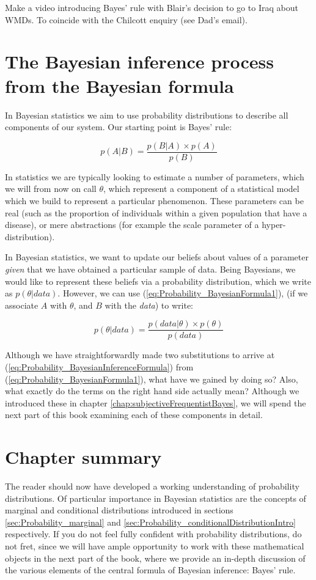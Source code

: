 \documentclass[11pt,fullpage]{book}
\begin{document}
 Make a video introducing Bayes' rule with Blair's decision to go to Iraq about WMDs. To coincide with the Chilcott enquiry (see Dad's email).

\section{The Bayesian inference process from the Bayesian formula}
In Bayesian statistics we aim to use probability distributions to describe all components of our system. Our starting point is Bayes' rule:

\begin{equation}\label{eq:Probability_BayesianFormula1}
p(A|B) = \frac{p(B|A)\times p(A)}{p(B)}
\end{equation}

In statistics we are typically looking to estimate a number of parameters, which we will from now on call $\theta$, which represent a component of a statistical model which we build to represent a particular phenomenon. These parameters can be real (such as the proportion of individuals within a given population that have a disease), or mere abstractions (for example the scale parameter of a hyper-distribution).

In Bayesian statistics, we want to update our beliefs about values of a parameter \textit{given} that we have obtained a particular sample of data. Being Bayesians, we would like to represent these beliefs via a probability distribution, which we write as $p(\theta|data)$. However, we can use (\ref{eq:Probability_BayesianFormula1}), (if we associate $A$ with $\theta$, and $B$ with the \textit{data}) to write:

\begin{equation}\label{eq:Probability_BayesianInferenceFormula}
p(\theta|data) = \frac{p(data|\theta)\times p(\theta)}{p(data)}
\end{equation}

Although we have straightforwardly made two substitutions to arrive at (\ref{eq:Probability_BayesianInferenceFormula}) from (\ref{eq:Probability_BayesianFormula1}), what have we gained by doing so? Also, what exactly do the terms on the right hand side actually mean? Although we introduced these in chapter \ref{chap:subjectiveFrequentistBayes}, we will spend the next part of this book examining each of these components in detail.

\section{Chapter summary}
The reader should now have developed a working understanding of probability distributions. Of particular importance in Bayesian statistics are the concepts of marginal and conditional distributions introduced in sections \ref{sec:Probability_marginal} and \ref{sec:Probability_conditionalDistributionIntro} respectively. If you do not feel fully confident with probability distributions, do not fret, since we will have ample opportunity to work with these mathematical objects in the next part of the book, where we provide an in-depth discussion of the various elements of the central formula of Bayesian inference: Bayes' rule.
\end{document}
